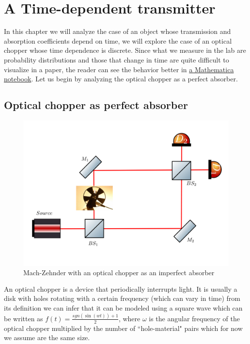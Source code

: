 \documentclass{book}
\begin{document}
\chapter{A Time-dependent transmitter}

In this chapter we will analyze the case of an object whose transmission and absorption coefficients depend on time, we will explore the case of an optical chopper whose time dependence is discrete. Since what we measure in the lab are probability distributions and those that change in time are quite difficult to visualize in a paper, the reader can see the behavior better in \href{https://github.com/mcditoos/Single-Photon-Mach-Zehnder-}{a Mathematica notebook}. Let us begin by analyzing the optical chopper as a perfect absorber.

\section{Optical chopper as perfect absorber }
 
 \begin{figure}[h!]
\centering
\includegraphics[width=\linewidth]{images/machzenhderchopper.png}
\caption{Mach-Zehnder with an optical chopper as an imperfect absorber}
\label{chopper}
\end{figure}
An optical chopper is a device that periodically interrupts light. It is usually a disk with holes rotating with a certain frequency (which can vary in time) from its definition we can infer that it can be modeled using a square wave which can be written as  $f(t)=\frac{sgn(\sin(wt))+1}{2}$, where $\omega$ is the angular frequency of the optical chopper multiplied by the number of ``hole-material" pairs which for now we assume are the same size.
 
\end{document}
